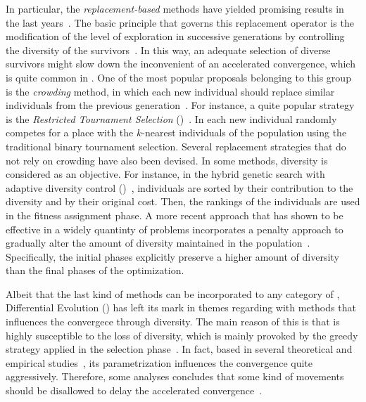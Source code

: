 %
In particular, the \textit{replacement-based} methods have yielded promising results in the last years~\cite{segura2016improving}.
%
The basic principle that governs this replacement operator is the modification of the level of exploration in successive generations by controlling the diversity of the survivors~\cite{segura2015novel}.
%
In this way, an adequate selection of diverse survivors might slow down the inconvenient of an accelerated convergence, which is quite common in \EAS{}.
%
One of the most popular proposals belonging to this group is the \textit{crowding} method, in which each new individual should replace similar individuals from the previous generation~\cite{mengshoel2014adaptive}.
%
For instance, a quite popular strategy is the \textit{Restricted Tournament Selection} (\RTS{})~\cite{harik1995finding}.
%
In \RTS{} each new individual randomly competes for a place with the $k$-nearest individuals of the population using the traditional binary tournament selection.
%
Several replacement strategies that do not rely on crowding have also been devised.
%
In some methods, diversity is considered as an objective.
%
For instance, in the hybrid genetic search with adaptive diversity control (\HGSADC{})~\cite{vidal2013hybrid}, individuals are sorted by their contribution to the diversity and by their original cost.
%
Then, the rankings of the individuals are used in the fitness assignment phase.
%
A more recent approach that has shown to be effective in a widely quantinty of problems incorporates a penalty approach to gradually alter the amount of diversity maintained in the population~\cite{segura2015novel, segura2016improving, castillo2019differential, angel2018explicit,romero2018memetic}.
%
Specifically, the initial phases explicitly preserve a higher amount of diversity than the final phases of the optimization.
%

Albeit that the last kind of methods can be incorporated to any category of \EA{}, Differential Evolution (\DE{}) has left its mark in themes regarding with methods that influences the convergece through diversity.
%
The main reason of this is that \DE{} is highly susceptible to the loss of diversity, which is mainly provoked by the greedy strategy applied in the selection phase~\cite{castillo2017multi}.
%
In fact, based in several theoretical and empirical studies~\cite{zaharie2003control, montgomery2009differential}, its parametrization influences the convergence quite aggressively.
%
Therefore, some analyses concludes that some kind of movements should be disallowed to delay the accelerated convergence~\cite{montgomery2009differential}.
%

